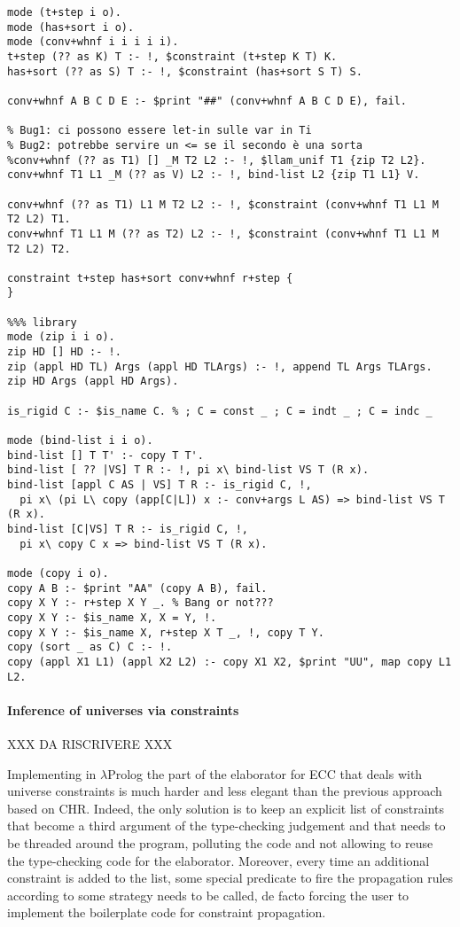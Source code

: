 \documentclass{easychair}
\begin{document}
\begin{verbatim}
mode (t+step i o).
mode (has+sort i o).
mode (conv+whnf i i i i i).
t+step (?? as K) T :- !, $constraint (t+step K T) K.
has+sort (?? as S) T :- !, $constraint (has+sort S T) S.

conv+whnf A B C D E :- $print "##" (conv+whnf A B C D E), fail.

% Bug1: ci possono essere let-in sulle var in Ti
% Bug2: potrebbe servire un <= se il secondo è una sorta
%conv+whnf (?? as T1) [] _M T2 L2 :- !, $llam_unif T1 {zip T2 L2}.
conv+whnf T1 L1 _M (?? as V) L2 :- !, bind-list L2 {zip T1 L1} V.

conv+whnf (?? as T1) L1 M T2 L2 :- !, $constraint (conv+whnf T1 L1 M T2 L2) T1.
conv+whnf T1 L1 M (?? as T2) L2 :- !, $constraint (conv+whnf T1 L1 M T2 L2) T2.

constraint t+step has+sort conv+whnf r+step {
}

%%% library
mode (zip i i o).
zip HD [] HD :- !.
zip (appl HD TL) Args (appl HD TLArgs) :- !, append TL Args TLArgs.
zip HD Args (appl HD Args).

is_rigid C :- $is_name C. % ; C = const _ ; C = indt _ ; C = indc _

mode (bind-list i i o).
bind-list [] T T' :- copy T T'.
bind-list [ ?? |VS] T R :- !, pi x\ bind-list VS T (R x).
bind-list [appl C AS | VS] T R :- is_rigid C, !,
  pi x\ (pi L\ copy (app[C|L]) x :- conv+args L AS) => bind-list VS T (R x).
bind-list [C|VS] T R :- is_rigid C, !,
  pi x\ copy C x => bind-list VS T (R x).

mode (copy i o).
copy A B :- $print "AA" (copy A B), fail.
copy X Y :- r+step X Y _. % Bang or not???
copy X Y :- $is_name X, X = Y, !.
copy X Y :- $is_name X, r+step X T _, !, copy T Y.
copy (sort _ as C) C :- !.
copy (appl X1 L1) (appl X2 L2) :- copy X1 X2, $print "UU", map copy L1 L2.
\end{verbatim}

\paragraph{Inference of universes via constraints}

XXX DA RISCRIVERE XXX

Implementing in $\lambda$Prolog the part of the elaborator for ECC that deals
with universe constraints is much harder and less elegant than the previous
approach based on CHR. Indeed, the only solution is to keep an explicit list
of constraints that become a third argument of the type-checking judgement and
that needs to be threaded around the program, polluting the code and not
allowing to reuse the type-checking code for the elaborator. Moreover, every
time an additional constraint is added to the list, some special predicate to
fire the propagation rules according to some strategy needs to be called, de
facto forcing the user to implement the boilerplate code for constraint
propagation.
\end{document}
